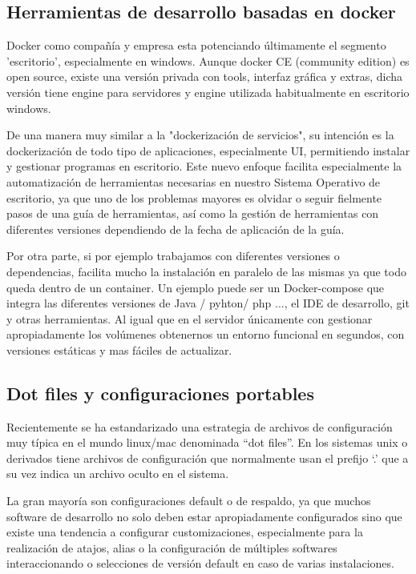 \subsection{Herramientas de desarrollo basadas en docker}
Docker como compañía y empresa esta potenciando últimamente el segmento 'escritorio', especialmente en windows. Aunque docker CE (community edition) es open source, existe una versión privada con tools, interfaz gráfica y extras, dicha versión tiene engine para servidores y engine utilizada habitualmente en escritorio windows.

De una manera muy similar a la "dockerización de servicios", su intención es la dockerización de todo tipo de aplicaciones, especialmente UI, permitiendo instalar y gestionar programas en escritorio. Este nuevo enfoque facilita especialmente la automatización de herramientas necesarias en nuestro Sistema Operativo de escritorio, ya que uno de los problemas mayores es olvidar o seguir fielmente pasos de una guía de herramientas, así como la gestión de herramientas con diferentes versiones dependiendo de la fecha de aplicación de la guía.

Por otra parte, si por ejemplo trabajamos con diferentes versiones o dependencias, facilita mucho la instalación en paralelo de las mismas ya que todo queda dentro de un container. Un ejemplo puede ser un Docker-compose que integra las diferentes versiones de Java / pyhton/ php ..., el IDE de desarrollo, git y otras herramientas. Al igual que en el servidor únicamente con gestionar apropiadamente los volúmenes obtenernos un entorno funcional en segundos, con versiones estáticas y mas fáciles de actualizar.

\subsection{Dot files y configuraciones portables}
Recientemente se ha estandarizado una estrategia de archivos de configuración muy típica en el mundo linux/mac denominada “dot files”\cite{c_dot}\cite{c_dot_tools}. En los sistemas unix o derivados tiene archivos de configuración que normalmente usan el prefijo ‘.’ que a su vez indica un archivo oculto en el sistema. 

La gran mayoría son configuraciones default o de respaldo, ya que muchos software de desarrollo no solo deben estar apropiadamente configurados sino que existe una tendencia a configurar customizaciones, especialmente para la realización de atajos, alias o la configuración de múltiples softwares interaccionando o selecciones de versión default en caso de varias instalaciones.

